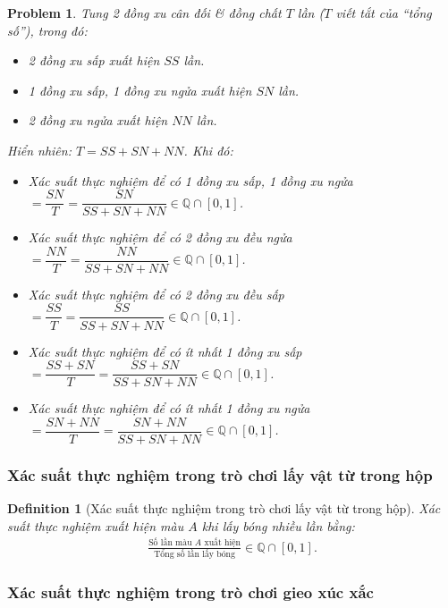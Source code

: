 \documentclass{article}
\numberwithin{equation}{section}
\newtheorem{definition}{Definition}[section]
\newtheorem{problem}{Problem}[section]
\begin{document}
\begin{problem}
	Tung 2 đồng xu cân đối \textit{\&} đồng chất $T$ lần ($T$ viết tắt của ``tổng số''), trong đó:
	\begin{itemize}
		\item 2 đồng xu sấp xuất hiện $SS$ lần.
		\item 1 đồng xu sấp, 1 đồng xu ngửa xuất hiện $SN$ lần.
		\item 2 đồng xu ngửa xuất hiện $NN$ lần.
	\end{itemize}
	Hiển nhiên: $T = SS + SN + NN$. Khi đó:
	\begin{itemize}
		\item Xác suất thực nghiệm để có 1 đồng xu sấp, 1 đồng xu ngửa $= \dfrac{SN}{T} = \dfrac{SN}{SS + SN + NN}\in\mathbb{Q}\cap[0,1]$.
		\item Xác suất thực nghiệm để có 2 đồng xu đều ngửa $= \dfrac{NN}{T} = \dfrac{NN}{SS + SN + NN}\in\mathbb{Q}\cap[0,1]$.
		\item Xác suất thực nghiệm để có 2 đồng xu đều sấp $= \dfrac{SS}{T} = \dfrac{SS}{SS + SN + NN}\in\mathbb{Q}\cap[0,1]$.
		\item Xác suất thực nghiệm để có ít nhất 1 đồng xu sấp $= \dfrac{SS + SN}{T} = \dfrac{SS + SN}{SS + SN + NN}\in\mathbb{Q}\cap[0,1]$.
		\item Xác suất thực nghiệm để có ít nhất 1 đồng xu ngửa $= \dfrac{SN + NN}{T} = \dfrac{SN + NN}{SS + SN + NN}\in\mathbb{Q}\cap[0,1]$.
	\end{itemize}
\end{problem}

\subsubsection{Xác suất thực nghiệm trong trò chơi lấy vật từ trong hộp}

\begin{definition}[Xác suất thực nghiệm trong trò chơi lấy vật từ trong hộp]
	\emph{Xác suất thực nghiệm xuất hiện màu $A$} khi lấy bóng nhiều lần bằng:
	\begin{align*}
		\frac{\mbox{Số lần màu $A$ xuất hiện}}{\mbox{Tổng số lần lấy bóng}}\in\mathbb{Q}\cap[0,1].
	\end{align*}
\end{definition}

\subsubsection{Xác suất thực nghiệm trong trò chơi gieo xúc xắc}
\end{document}
